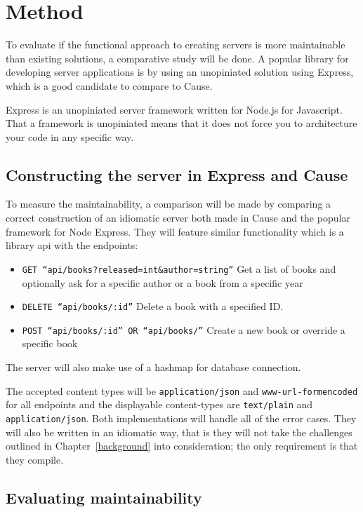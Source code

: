 \chapter{Method}

To evaluate if the functional approach to creating servers is more maintainable
than existing solutions, a comparative study will be done. A popular library for
developing server applications is by using an unopiniated solution using
Express, which is a good candidate to compare to Cause.

Express is an unopiniated server framework written for Node.js for Javascript.
That a framework is unopiniated means that it does not force you to architecture
your code in any specific way.  

\section{Constructing the server in Express and Cause}

To measure the maintainability, a comparison will be made by comparing a correct
construction of an idiomatic server both made in Cause and the popular framework
for Node Express. They will feature similar functionality which is a library api
with the endpoints:

\begin{itemize}
    \item \texttt{GET ``api/books?released=int\&author=string''} Get a list of
    books and optionally ask for a specific author or a book from a specific
    year
    \item \texttt{DELETE ``api/books/:id''} Delete a book with a specified ID.
    \item \texttt{POST ``api/books/:id'' OR ``api/books/''} Create a new book or
    override a specific book
\end{itemize}

The server will also make use of a hashmap for database connection.

The accepted content types will be \texttt{application/json} and
\texttt{www-url-formencoded} for all endpoints and the displayable content-types
are \texttt{text/plain} and \texttt{application/json}. Both implementations will handle
all of the error cases. They will also be written in an idiomatic way, that is
they will not take the challenges outlined in Chapter~\ref{background} into
consideration; the only requirement is that they compile.

\section{Evaluating maintainability}

